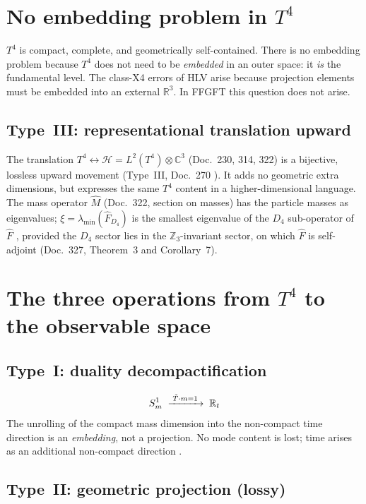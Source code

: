 \section{No embedding problem in $T^4$}
\label{sec:noembed}

$T^4$ is compact, complete, and geometrically self-contained.
There is no embedding problem because $T^4$ does not need to be
\emph{embedded} in an outer space: it \emph{is} the fundamental
level. The class-X4 errors of HLV arise because projection elements
must be embedded into an external $\mathbb{R}^3$. In FFGFT
this question does not arise.

\subsection{Type~III: representational translation upward}

The translation $T^4\leftrightarrow\mathcal{H} = L^2(T^4)\otimes\mathbb{C}^3$
(Doc.~230, 314, 322) is a bijective, lossless upward movement
(Type~III, Doc.~270 \K).
It adds no geometric extra dimensions, but expresses the same
$T^4$ content in a higher-dimensional language.
The mass operator $\hat{M}$ (Doc.~322, section on masses) has the
particle masses as eigenvalues; $\xi = \lambda_{\min}(\hat{F}_{D_4})$
is the smallest eigenvalue of the $D_4$ sub-operator of $\hat{F}$ \B,
provided the $D_4$ sector lies in the $\mathbb{Z}_3$-invariant sector,
on which $\hat{F}$ is self-adjoint (Doc.~327, Theorem~3 and
Corollary~7).

\section{The three operations from $T^4$ to the observable space}
\label{sec:operations}

\subsection{Type~I: duality decompactification}
\[
  S^1_m\;\xrightarrow{\;\tilde{T}\cdot m=1\;}\;\mathbb{R}_t
\]
The unrolling of the compact mass dimension into the non-compact
time direction is an \emph{embedding}, not a projection.
No mode content is lost; time arises as an additional non-compact
direction \K.

\subsection{Type~II: geometric projection (lossy)}

